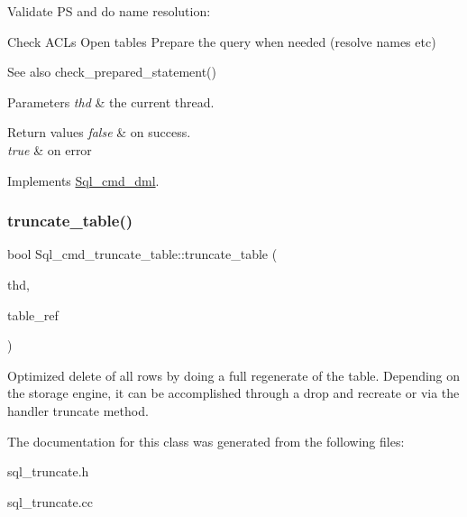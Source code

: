 Validate PS and do name resolution\+:

Check A\+C\+Ls Open tables Prepare the query when needed (resolve names etc)

\begin{DoxySeeAlso}{See also}
check\+\_\+prepared\+\_\+statement()
\end{DoxySeeAlso}

\begin{DoxyParams}{Parameters}
{\em thd} & the current thread.\\
\hline
\end{DoxyParams}

\begin{DoxyRetVals}{Return values}
{\em false} & on success. \\
\hline
{\em true} & on error \\
\hline
\end{DoxyRetVals}


Implements \mbox{\hyperlink{classSql__cmd__dml_af36dc69e855d0e48d0e79002576907a4}{Sql\+\_\+cmd\+\_\+dml}}.

\mbox{\label{classSql__cmd__truncate__table_afed41fd98851c52b23fee9e30e9fe981}} 
\subsubsection{\texorpdfstring{truncate\+\_\+table()}{truncate\_table()}}
{\footnotesize\ttfamily bool Sql\+\_\+cmd\+\_\+truncate\+\_\+table\+::truncate\+\_\+table (\begin{DoxyParamCaption}\item[{T\+HD $\ast$}]{thd,  }\item[{\mbox{\hyperlink{structTABLE__LIST}{T\+A\+B\+L\+E\+\_\+\+L\+I\+ST}} $\ast$}]{table\+\_\+ref }\end{DoxyParamCaption})\hspace{0.3cm}{\ttfamily [protected]}}

Optimized delete of all rows by doing a full regenerate of the table. Depending on the storage engine, it can be accomplished through a drop and recreate or via the handler truncate method. 

The documentation for this class was generated from the following files\+:\begin{DoxyCompactItemize}
\item 
sql\+\_\+truncate.\+h\item 
sql\+\_\+truncate.\+cc\end{DoxyCompactItemize}
